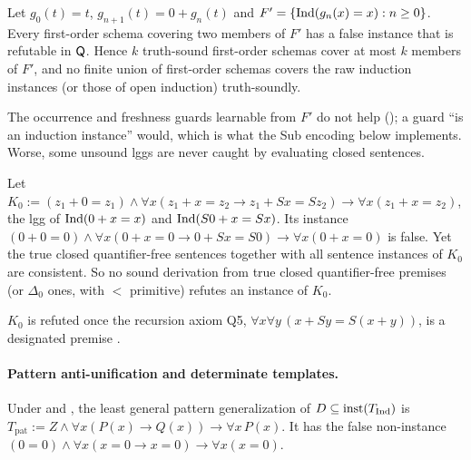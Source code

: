 \begin{theorem}\label{thm:zf:indunion}
Let $g_0(t)=t$, $g_{n+1}(t)=0+g_n(t)$ and $F'=\{\mathrm{Ind}(g_n(x)=x):n\ge0\}$. Every first-order schema covering two members
of $F'$ has a false instance that is refutable in $\mathsf{Q}$. Hence $k$ truth-sound first-order schemas cover at most $k$
members of $F'$, and no finite union of first-order schemas covers the raw induction instances (or those of open
induction) truth-soundly.
\end{theorem}
The occurrence and freshness guards learnable from $F'$ do not help (); a guard ``is an induction
instance'' would, which is what the Sub encoding below implements. Worse, some unsound lggs are never caught by
evaluating closed sentences.

\begin{theorem}\label{thm:zf:K0}
Let $K_0:=(z_1+0=z_1)\wedge\forall x(z_1+x=z_2\to z_1+Sx=Sz_2)\to\forall x(z_1+x=z_2)$, the lgg of $\mathrm{Ind}(0+x=x)$ and
$\mathrm{Ind}(S0+x=Sx)$. Its instance $(0+0=0)\wedge\forall x(0+x=0\to0+Sx=S0)\to\forall x(0+x=0)$ is false. Yet the true
closed quantifier-free sentences together with all sentence instances of $K_0$ are consistent. So no sound derivation
from true closed quantifier-free premises (or $\Delta_0$ ones, with $<$ primitive) refutes an instance of $K_0$.
\end{theorem}
$K_0$ is refuted once the recursion axiom Q5, $\forall x\forall y\,(x+Sy=S(x+y))$, is a designated premise .

\paragraph{Pattern anti-unification and determinate templates.}

\begin{proposition}\label{prop:zf:indpat}
Under \evR{} and \evN, the least general pattern generalization of $D\subseteq\mathrm{inst}(T_{\mathrm{Ind}})$ is
$T_{\mathrm{pat}}:=Z\wedge\forall x(P(x)\to Q(x))\to\forall x\,P(x)$. It has the false non-instance
$(0=0)\wedge\forall x(x=0\to x=0)\to\forall x(x=0)$.
\end{proposition}

